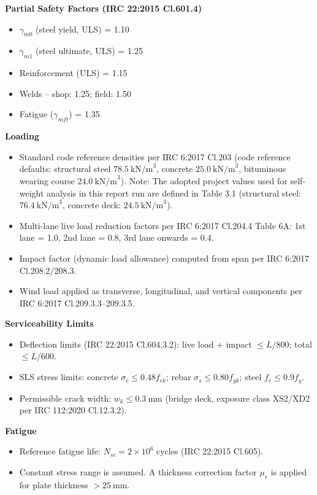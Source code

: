 \documentclass[12pt,a4paper]{report}
\numberwithin{table}{chapter}
\numberwithin{figure}{chapter}
\begin{document}
\textbf{Partial Safety Factors (IRC 22:2015 Cl.601.4)}

\begin{itemize}
\item $\gamma_{m0}$ (steel yield, ULS) = 1.10
\item $\gamma_{m1}$ (steel ultimate, ULS) = 1.25
\item Reinforcement (ULS) = 1.15
\item Welds -- shop: 1.25; field: 1.50
\item Fatigue ($\gamma_{mft}$) = 1.35
\end{itemize}

\textbf{Loading}

\begin{itemize}
\item Standard code reference densities per IRC 6:2017 Cl.203 (code reference defaults: structural steel $78.5 \ \text{kN/m}^3$, concrete $25.0 \ \text{kN/m}^3$, bituminous wearing course $24.0 \ \text{kN/m}^3$). Note: The adopted project values used for self-weight analysis in this report run are defined in Table 3.1 (structural steel: $76.4 \ \text{kN/m}^3$, concrete deck: $24.5 \ \text{kN/m}^3$).
\item Multi-lane live load reduction factors per IRC 6:2017 Cl.204.4 Table 6A: 1st lane = 1.0, 2nd lane = 0.8, 3rd lane onwards = 0.4.
\item Impact factor (dynamic load allowance) computed from span per IRC 6:2017 Cl.208.2/208.3.
\item Wind load applied as transverse, longitudinal, and vertical components per IRC 6:2017 Cl.209.3.3--209.3.5.
\end{itemize}

\textbf{Serviceability Limits}

\begin{itemize}
\item Deflection limits (IRC 22:2015 Cl.604.3.2): live load + impact $\leq L/800$; total $\leq L/600$.
\item SLS stress limits: concrete $\sigma_c \leq 0.48 f_{ck}$; rebar $\sigma_s \leq 0.80 f_{yk}$; steel $f_e \leq 0.9 f_y$.
\item Permissible crack width: $w_k \leq 0.3 \ \text{mm}$ (bridge deck, exposure class XS2/XD2 per IRC 112:2020 Cl.12.3.2).
\end{itemize}

\textbf{Fatigue}

\begin{itemize}
\item Reference fatigue life: $N_{sc} = 2 \times 10^6$ cycles (IRC 22:2015 Cl.605).
\item Constant stress range is assumed. A thickness correction factor $\mu_r$ is applied for plate thickness $> 25 \ \text{mm}$.
\end{itemize}
\end{document}
